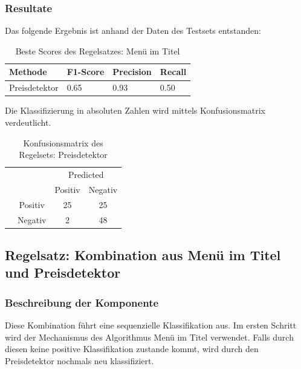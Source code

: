 \subsubsection{Resultate}
Das folgende Ergebnis ist anhand der Daten des Testsets entstanden:
\begin{table}[H]
	\caption{Beste Scores des Regelsatzes: Menü im Titel}
	\centering
	\begin{tabular}{|l|l|l|l|}
		\hline
		Methode & F1-Score & Precision & Recall\\
		\hline
		Preisdetektor & 0.65 & 0.93 & 0.50 \\
		\hline
	\end{tabular}
\end{table}
Die Klassifizierung in absoluten Zahlen wird mittels Konfusionsmatrix verdeutlicht.
\begin{table}[H]
	\caption{Konfusionsmatrix des Regelsets: Preisdetektor}
	\centering
	\begin{tabular}{@{}cc|cc@{}}
		\multicolumn{1}{c}{} &\multicolumn{1}{c}{} &\multicolumn{2}{c}{Predicted} \\ 
		\multicolumn{1}{c}{} & 
		\multicolumn{1}{c|}{} & 
		\multicolumn{1}{c}{Positiv} & 
		\multicolumn{1}{c}{Negativ} \\ 
		\cline{2-4}
		\multirow[c]{2}{*}{\rotatebox[origin=tr]{90}{Actual}}
		& Positiv  & 25   & 25   \\[1.5ex]
		& Negativ  & 2    & 48 \\ 
		\cline{2-4}
	\end{tabular}
\end{table}
\subsection{Regelsatz: Kombination aus Menü im Titel und Preisdetektor}
\subsubsection{Beschreibung der Komponente}
Diese Kombination führt eine sequenzielle Klassifikation aus.
Im ersten Schritt wird der Mechanismus des Algorithmus \glqq Menü im Titel\grqq{} verwendet.
Falls durch diesen keine positive Klassifikation zustande kommt, wird durch den Preisdetektor nochmals neu klassifiziert.
